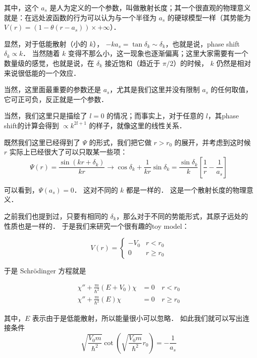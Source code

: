 其中，这个 $a_s$ 是人为定义的一个参数，叫做散射长度；其一个很直观的物理意义就是：在远处波函数的行为可以认为与一个半径为 $a_s$ 的硬球模型一样（其势能为 $V(r) = (1-\theta(r-a_s)) \times +\infty$）．

显然，对于低能散射（小的 $k$）， $-ka_s = \tan\delta_k \sim \delta_k$，也就是说，phase shift $\delta_k \propto k$． 当然随着 $k$ 变得不那么小，这一现象也逐渐偏离；这里大家需要有一个数量级的感觉，也就是说，在 $\delta_k$ 接近饱和（趋近于 $\pi/2$）的时候， $k$ 仍然是相对来说很低能的一个效应．

当然，这里面最重要的参数还是 $a_s$，尤其是我们这里并没有限制 $a_s$ 的任何取值，它可正可负，反正就是一个参数．

当然，我们这里只是描绘了 $l = 0$ 的情况；而事实上，对于任意的 $l$，其phase shift的计算会得到 $\propto k^{2l+1}$ 的样子，就像这里的线性关系．

既然我们这里已经得到了 $\Psi$ 的形式，我们把它做 $r>r_0$ 的展开，并考虑到这时候 $r$ 实际上已经很大了可以只取某一些项：
\begin{equation}
\Psi(r) = \frac{\sin(kr+\delta_k)}{kr} \to \cos\delta_k +\frac{1}{kr}\sin\delta_k = \frac{\sin\delta_k}{k}\left[\frac{1}{r}-\frac{1}{a_s}\right]
\end{equation}

可以看到，$\Psi(a_s)=0$． 这对不同的 $k$ 都是一样的． 这是一个散射长度的物理意义．

之前我们也提到过，只要有相同的 $\delta_k$，那么对于不同的势能形式，其原子远处的性质也是一样的． 于是我们来研究一个很有趣的toy model：

\begin{equation}
V(r)=\begin{cases}
-V_0 & r<r_0\\
0 & r\ge r_0
\end{cases}
\end{equation}

于是 Schrödinger 方程就是

\begin{align}
\chi''+\frac{m}{\hbar^2}(E+V_0)\chi &= 0\quad r<r_0\\
\chi''+\frac{m}{\hbar^2}(E)\chi &= 0\quad r\ge r_0
\end{align}

其中，$E$ 表示由于是低能散射，所以能量很小可以忽略． 如此我们就可以写出连接条件
\begin{equation}
\sqrt{\frac{V_0 m}{\hbar^2}}\cot\left(\sqrt{\frac{V_0 m}{\hbar^2}}r_0\right) = -\frac{1}{a_s}
\end{equation}

